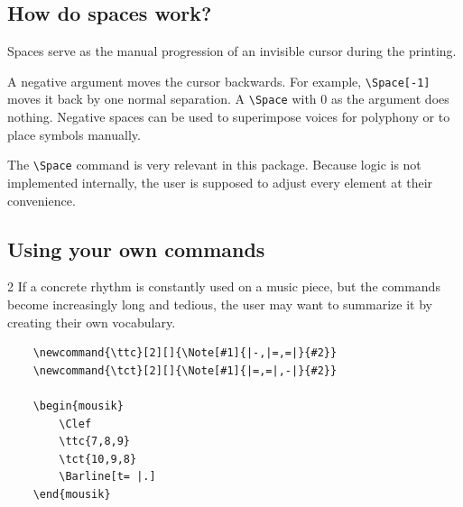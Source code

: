 \documentclass[final]{article}
\begin{document}
	\begin{mousik}
		\Clef
\Space[0.5]
		\Barline
		\Barline
		\Barline
		\Barline
\Barline[t=|.]
	\end{mousik}

	
	\subsection*{How do spaces work?}
	
	Spaces serve as the manual progression of an invisible cursor during the printing.
	
	A negative argument moves the cursor backwards. For example, \verb|\Space[-1]| moves it back by one normal separation. A \verb|\Space| with 0 as the argument does nothing. Negative spaces can be used to superimpose voices for polyphony or to place symbols manually.
	
	The \verb|\Space| command is very relevant in this package. Because logic is not implemented internally, the user is supposed to adjust every element at their convenience.
	
	\subsection*{Using your own commands}
	\begin{multicols}{2}
		If a concrete rhythm is constantly used on a music piece, but the commands become increasingly long and tedious, the user may want to summarize it by creating their own vocabulary.
		
		\newcommand{\ttc}[2][]{\Note[#1]{|-,|=,=|}{#2}}
		\newcommand{\tct}[2][]{\Note[#1]{|=,=|,-|}{#2}}
		\begin{mousik}
			\Clef
			\ttc{7,8,9}
			\tct{10,9,8}
			\Barline[t= |.]
		\end{mousik}
	\end{multicols}
	
	
	\begin{lstlisting}
	\newcommand{\ttc}[2][]{\Note[#1]{|-,|=,=|}{#2}}
	\newcommand{\tct}[2][]{\Note[#1]{|=,=|,-|}{#2}}
	
	\begin{mousik}
		\Clef
		\ttc{7,8,9}
		\tct{10,9,8}
		\Barline[t= |.]
	\end{mousik}
	\end{lstlisting}
	
\end{document}
